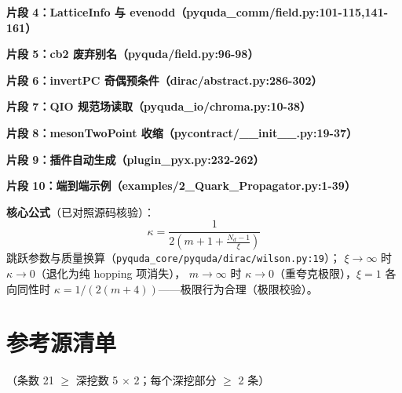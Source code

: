 \documentclass[UTF8]{ctexart}
\begin{document}
\textbf{片段 4：LatticeInfo 与 evenodd（pyquda\_comm/field.py:101-115,141-161）}



\textbf{片段 5：cb2 废弃别名（pyquda/field.py:96-98）}


\textbf{片段 6：invertPC 奇偶预条件（dirac/abstract.py:286-302）}


\textbf{片段 7：QIO 规范场读取（pyquda\_io/chroma.py:10-38）}


\textbf{片段 8：mesonTwoPoint 收缩（pycontract/\_\_init\_\_.py:19-37）}


\textbf{片段 9：插件自动生成（plugin\_pyx.py:232-262）}


\textbf{片段 10：端到端示例（examples/2\_Quark\_Propagator.py:1-39）}


\textbf{核心公式}（已对照源码核验）：
\begin{equation}\label{eq:kappa}
\kappa=\frac{1}{2\left(m+1+\frac{N_d-1}{\xi}\right)}
\end{equation}
跳跃参数与质量换算（\texttt{\nolinkurl{pyquda_core/pyquda/dirac/wilson.py:19}}）；
$\xi\to\infty$ 时 $\kappa\to 0$（退化为纯 hopping 项消失），
$m\to\infty$ 时 $\kappa\to 0$（重夸克极限），$\xi=1$ 各向同性时
$\kappa=1/(2(m+4))$——极限行为合理（\textcolor{phys}{极限校验}）。

\section{参考源清单}
（条数 21 $\ge$ 深挖数 5 $\times$ 2；每个深挖部分 $\ge$ 2 条）
\end{document}
